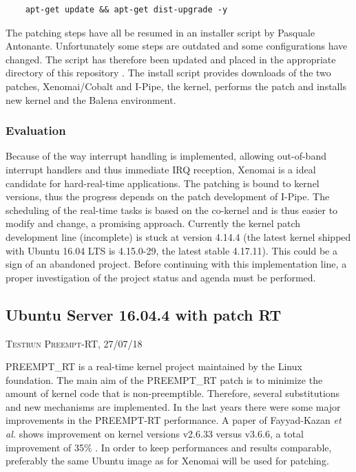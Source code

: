 \documentclass[]{scrartcl}
\begin{document}
\begin{verbatim}
	apt-get update && apt-get dist-upgrade -y
\end{verbatim}

The patching steps have all be resumed in an installer script by Pasquale Antonante. Unfortunately some steps are outdated and some configurations have changed. The script has therefore been updated and placed in the appropriate directory of this repository \cite{gitrepo}. The install script provides downloads of the two patches, Xenomai/Cobalt and I-Pipe, the kernel, performs the patch and installs new kernel and the Balena environment.

\subsubsection{Evaluation}

Because of the way interrupt handling is implemented, allowing out-of-band interrupt handlers and thus immediate IRQ reception, Xenomai is a ideal candidate for hard-real-time applications. The patching is bound to kernel versions, thus the progress depends on the patch development of I-Pipe. 
The scheduling of the real-time tasks is based on the co-kernel and is thus easier to modify and change, a promising approach.
Currently the kernel patch development line (incomplete) is stuck at version 4.14.4 (the latest kernel shipped with Ubuntu 16.04 LTS is 4.15.0-29, the latest stable 4.17.11). This could be a sign of an abandoned project. Before continuing with this implementation line, a proper investigation of the project status and agenda must be performed.

\subsection{Ubuntu Server 16.04.4 with patch RT}

{\small\textsc{Testrun Preempt-RT, 27/07/18} \bigskip}

PREEMPT\_RT is a real-time kernel project maintained by the Linux foundation. 
The main aim of the PREEMPT\_RT patch is to minimize the amount of kernel code that is non-preemptible. Therefore, several substitutions and new mechanisms are implemented.
In the last years there were some major improvements in the PREEMPT-RT performance. A paper of Fayyad-Kazan \textit{et al.} shows improvement on kernel versions v2.6.33 versus v3.6.6, a total improvement of 35\% \cite{Fayyad-Kazanetal2014}. In order to keep performances and results comparable, preferably the same Ubuntu image as for Xenomai will be used for patching.
\end{document}
